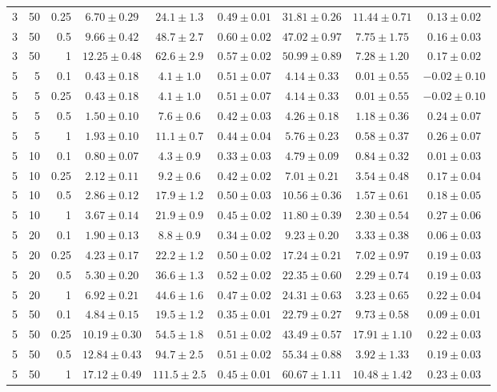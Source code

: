 \begin{table}[htbp]
\begin{tabular}{@{}rrrcccccc@{}}
3 & 50 & 0.25 & $6.70 \pm 0.29$ & $24.1 \pm 1.3$ & $0.49 \pm 0.01$ & $31.81 \pm 0.26$ & $11.44 \pm 0.71$ & $0.13 \pm 0.02$ \\
3 & 50 & 0.5 & $9.66 \pm 0.42$ & $48.7 \pm 2.7$ & $0.60 \pm 0.02$ & $47.02 \pm 0.97$ & $7.75 \pm 1.75$ & $0.16 \pm 0.03$ \\
3 & 50 & 1 & $12.25 \pm 0.48$ & $62.6 \pm 2.9$ & $0.57 \pm 0.02$ & $50.99 \pm 0.89$ & $7.28 \pm 1.20$ & $0.17 \pm 0.02$ \\
\midrule
5 & 5 & 0.1 & $0.43 \pm 0.18$ & $4.1 \pm 1.0$ & $0.51 \pm 0.07$ & $4.14 \pm 0.33$ & $0.01 \pm 0.55$ & $-0.02 \pm 0.10$ \\
5 & 5 & 0.25 & $0.43 \pm 0.18$ & $4.1 \pm 1.0$ & $0.51 \pm 0.07$ & $4.14 \pm 0.33$ & $0.01 \pm 0.55$ & $-0.02 \pm 0.10$ \\
5 & 5 & 0.5 & $1.50 \pm 0.10$ & $7.6 \pm 0.6$ & $0.42 \pm 0.03$ & $4.26 \pm 0.18$ & $1.18 \pm 0.36$ & $0.24 \pm 0.07$ \\
5 & 5 & 1 & $1.93 \pm 0.10$ & $11.1 \pm 0.7$ & $0.44 \pm 0.04$ & $5.76 \pm 0.23$ & $0.58 \pm 0.37$ & $0.26 \pm 0.07$ \\
5 & 10 & 0.1 & $0.80 \pm 0.07$ & $4.3 \pm 0.9$ & $0.33 \pm 0.03$ & $4.79 \pm 0.09$ & $0.84 \pm 0.32$ & $0.01 \pm 0.03$ \\
5 & 10 & 0.25 & $2.12 \pm 0.11$ & $9.2 \pm 0.6$ & $0.42 \pm 0.02$ & $7.01 \pm 0.21$ & $3.54 \pm 0.48$ & $0.17 \pm 0.04$ \\
5 & 10 & 0.5 & $2.86 \pm 0.12$ & $17.9 \pm 1.2$ & $0.50 \pm 0.03$ & $10.56 \pm 0.36$ & $1.57 \pm 0.61$ & $0.18 \pm 0.05$ \\
5 & 10 & 1 & $3.67 \pm 0.14$ & $21.9 \pm 0.9$ & $0.45 \pm 0.02$ & $11.80 \pm 0.39$ & $2.30 \pm 0.54$ & $0.27 \pm 0.06$ \\
5 & 20 & 0.1 & $1.90 \pm 0.13$ & $8.8 \pm 0.9$ & $0.34 \pm 0.02$ & $9.23 \pm 0.20$ & $3.33 \pm 0.38$ & $0.06 \pm 0.03$ \\
5 & 20 & 0.25 & $4.23 \pm 0.17$ & $22.2 \pm 1.2$ & $0.50 \pm 0.02$ & $17.24 \pm 0.21$ & $7.02 \pm 0.97$ & $0.19 \pm 0.03$ \\
5 & 20 & 0.5 & $5.30 \pm 0.20$ & $36.6 \pm 1.3$ & $0.52 \pm 0.02$ & $22.35 \pm 0.60$ & $2.29 \pm 0.74$ & $0.19 \pm 0.03$ \\
5 & 20 & 1 & $6.92 \pm 0.21$ & $44.6 \pm 1.6$ & $0.47 \pm 0.02$ & $24.31 \pm 0.63$ & $3.23 \pm 0.65$ & $0.22 \pm 0.04$ \\
5 & 50 & 0.1 & $4.84 \pm 0.15$ & $19.5 \pm 1.2$ & $0.35 \pm 0.01$ & $22.79 \pm 0.27$ & $9.73 \pm 0.58$ & $0.09 \pm 0.01$ \\
5 & 50 & 0.25 & $10.19 \pm 0.30$ & $54.5 \pm 1.8$ & $0.51 \pm 0.02$ & $43.49 \pm 0.57$ & $17.91 \pm 1.10$ & $0.22 \pm 0.03$ \\
5 & 50 & 0.5 & $12.84 \pm 0.43$ & $94.7 \pm 2.5$ & $0.51 \pm 0.02$ & $55.34 \pm 0.88$ & $3.92 \pm 1.33$ & $0.19 \pm 0.03$ \\
5 & 50 & 1 & $17.12 \pm 0.49$ & $111.5 \pm 2.5$ & $0.45 \pm 0.01$ & $60.67 \pm 1.11$ & $10.48 \pm 1.42$ & $0.23 \pm 0.03$ \\
\bottomrule
\end{tabular}
\end{table}

